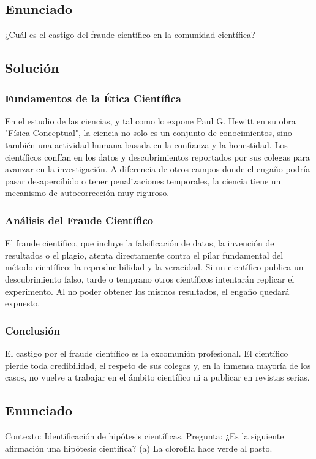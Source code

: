 \documentclass[12pt,letterpaper]{article}
\begin{document}
\subsection*{Enunciado}
¿Cuál es el castigo del fraude científico en la comunidad científica?

\subsection*{Solución}

\subsubsection*{Fundamentos de la Ética Científica}
En el estudio de las ciencias, y tal como lo expone Paul G. Hewitt en su obra "Física Conceptual", la ciencia no solo es un conjunto de conocimientos, sino también una actividad humana basada en la confianza y la honestidad. Los científicos confían en los datos y descubrimientos reportados por sus colegas para avanzar en la investigación. A diferencia de otros campos donde el engaño podría pasar desapercibido o tener penalizaciones temporales, la ciencia tiene un mecanismo de autocorrección muy riguroso.

\subsubsection*{Análisis del Fraude Científico}
El fraude científico, que incluye la falsificación de datos, la invención de resultados o el plagio, atenta directamente contra el pilar fundamental del método científico: la reproducibilidad y la veracidad. Si un científico publica un descubrimiento falso, tarde o temprano otros científicos intentarán replicar el experimento. Al no poder obtener los mismos resultados, el engaño quedará expuesto. 

\subsubsection*{Conclusión}
El castigo por el fraude científico es la excomunión profesional. El científico pierde toda credibilidad, el respeto de sus colegas y, en la inmensa mayoría de los casos, no vuelve a trabajar en el ámbito científico ni a publicar en revistas serias.

\newpage

\subsection*{Enunciado}
Contexto: Identificación de hipótesis científicas.
Pregunta: ¿Es la siguiente afirmación una hipótesis científica? (a) La clorofila hace verde al pasto.
\end{document}
